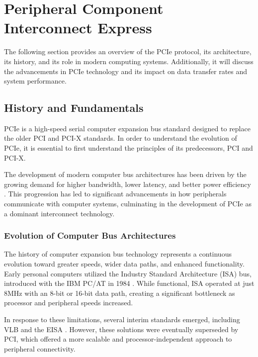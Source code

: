 \section{Peripheral Component Interconnect Express}
\label{sec:pcie}

The following section provides an overview of the \ac{PCIe} protocol, its architecture, its history, 
and its role in modern computing systems. Additionally, it will discuss the advancements in PCIe technology 
and its impact on data transfer rates and system performance.

\subsection{History and Fundamentals}
\label{subsec:pcie_history}

\ac{PCIe} is a high-speed serial computer expansion bus standard designed to 
replace the older \ac{PCI} and \ac{PCI-X} standards. In order to understand 
the evolution of \ac{PCIe}, it is essential to first understand the principles 
of its predecessors, \ac{PCI} and \ac{PCI-X}.

The development of modern computer bus architectures has been driven by the 
growing demand for higher bandwidth, lower latency, and better power 
efficiency \parencite{budruk2003pci}. This progression 
has led to significant advancements in how peripherals communicate 
with computer systems, culminating in the development of \ac{PCIe} as a 
dominant interconnect technology.

\subsubsection{Evolution of Computer Bus Architectures}
\label{subsubsec:pcie_evolution_bus}

The history of computer expansion bus technology represents a 
continuous evolution toward greater speeds, wider data paths, 
and enhanced functionality. Early personal computers utilized 
the Industry Standard Architecture (ISA) bus, introduced with 
the IBM PC/AT in 1984 \parencite{messmer1995pc}. 
While functional, ISA operated at just 8MHz with an 8-bit 
or 16-bit data path, creating a significant bottleneck 
as processor and peripheral speeds increased.

In response to these limitations, several interim standards emerged, 
including \ac{VLB} and the \ac{EISA} \parencite[pp. 9-10]{abbott2003pci}.
However, these solutions were eventually superseded by \ac{PCI}, 
which offered a more scalable and processor-independent approach to peripheral connectivity.

